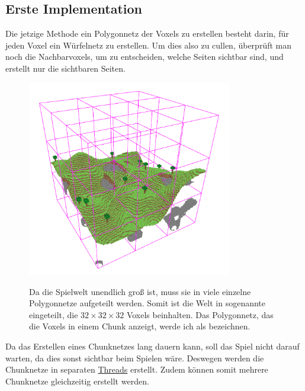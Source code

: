 \subsection{Erste Implementation}

Die jetzige Methode ein Polygonnetz der Voxels
zu erstellen besteht darin, für jeden Voxel
ein Würfelnetz zu erstellen.
Um dies also zu cullen, überprüft man
noch die Nachbarvoxels, um zu entscheiden,
welche Seiten sichtbar sind, und erstellt nur
die sichtbaren Seiten.

\begin{figure}[ht]
	\begin{minipage}[c]{0.49\textwidth}
		\begin{center}
\includegraphics[width=0.8\textwidth]{../assets/culling/chunk_borders.png}
		\end{center}
	\end{minipage}
	\begin{minipage}[c]{0.49\textwidth}
Da die Spielwelt unendlich groß ist, muss sie
in viele einzelne Polygonnetze aufgeteilt werden.
Somit ist die Welt in sogenannte 
eingeteilt, die $32 \times 32 \times 32$ Voxels
beinhalten. Das Polygonnetz, das die Voxels in einem
Chunk anzeigt, werde ich als
 bezeichnen.
	\end{minipage}\hfill
\end{figure}

Da das Erstellen eines Chunknetzes lang dauern kann,
soll das Spiel nicht darauf warten,
da dies sonst sichtbar beim Spielen wäre.
Deswegen werden die Chunknetze in separaten
\href{https://de.wikipedia.org/wiki/Thread_(Informatik)}{Threads}
\cite{wiki_thread} erstellt.
Zudem können somit mehrere Chunknetze gleichzeitig
erstellt werden.

